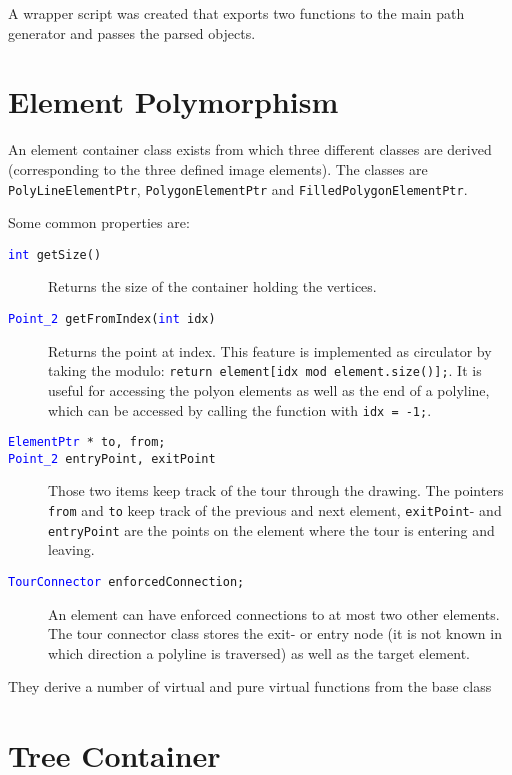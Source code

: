 A wrapper script was created that exports two functions to the main path generator and passes the parsed objects.

\section{Element Polymorphism}

An element container class exists from which three different classes are derived (corresponding to the three defined image elements). The classes are \texttt{PolyLineElementPtr}, \texttt{PolygonElementPtr} and \texttt{FilledPolygonElementPtr}.

Some common properties are:

\begin{description}

\item[\texttt{\textcolor{blue}{int} getSize()}] Returns the size of the container holding the vertices.

\item[\texttt{\textcolor{blue}{Point\_2} getFromIndex(\textcolor{blue}{int} idx)}] Returns the point at index. This feature is implemented as circulator by taking the modulo: 
\texttt{return element[idx mod element.size()];}. 
It is useful for accessing the polyon elements as well as the end of a polyline, which can be accessed by calling the
function with \texttt{idx = -1;}.

\item[\texttt{\textcolor{blue}{ElementPtr} * to, from;}]
\item[\texttt{\textcolor{blue}{Point\_2} entryPoint, exitPoint}] Those two items keep track of the tour through the drawing. The pointers \texttt{from} and \texttt{to} keep track of the previous and next element, 
\texttt{exitPoint}- and \texttt{entryPoint} are the points on the element where the tour is entering and leaving.

\item[\texttt{\textcolor{blue}{TourConnector} enforcedConnection;}] An element can have enforced connections to at most two other elements. The tour connector class stores the exit- or entry node (it is not known in which direction a polyline is traversed) as well as the target element.

\end{description}

They derive a number of virtual and pure virtual functions from the base class

\section{Tree Container}

